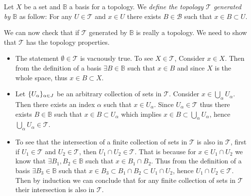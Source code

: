 \begin{definition}
	Let $ X $ be a set and $ \mathbb{B} $ a basis for a topology. We \emph{define the topology $ \mathcal{T} $ generated by $ \mathbb{B} $} as follow: For any $ U \in \mathcal{T} $ and $ x \in U $ there exists $ B \in \mathcal{B} $ such that $ x \in B \subset U $.
\end{definition}
\begin{remark}
	\label{remark:TopologyGeneratedByABasis}
	We can now check that if $ \mathcal{T} $ generated by $ \mathbb{B} $ is really a topology. We need to show that $ \mathcal{T} $ has the topology properties.
	\begin{itemize}
		\item The statement $ \emptyset \in \mathcal{T} $ is vacuously true. To see $ X \in \mathcal{T} $, Consider $ x \in X $. Then from the definition of a basis $ \exists B \in \mathbb{B} $ such that $ x \in B $ and since $ X $ is the whole space, thus $ x \in B \subset X $.
		\item Let $ \{U_\alpha\}_{\alpha \in J} $ be an arbitrary collection of sets in $ \mathcal{T} $. Consider $ x \in \bigcup_\alpha U_\alpha $. Then there exists an index $ \alpha $ such that $ x \in U_\alpha $. Since $ U_\alpha \in \mathcal{T} $ thus there exists $ B \in \mathbb{B} $ such that $ x \in B \subset U_\alpha $ which implies $ x \in B \subset \bigcup_\alpha U_\alpha $, hence $ \bigcup_\alpha U_\alpha \in \mathcal{T} $.
		\item To see that the intersection of a finite collection of sets in $ \mathcal{T} $ is also in $ \mathcal{T} $, first if $ U_1 \in \mathcal{T} $ and $ U_2 \in \mathcal{T} $, then $ U_1 \cap U_2 \in \mathcal{T} $. That is because for $ x\in U_1 \cap U_2 $ we know that $ \exists B_1,B_2 \in \mathbb{B} $ such that $ x\in B_1\cap B_2 $. Thus from the definition of a basis $ \exists B_3 \in \mathbb{B} $ such that $ x \in B_3 \subset B_1\cap B_2 \subset U_1\cap U_2 $, hence $ U_1\cap U_2 \in \mathcal{T} $. Then by induction we can conclude that for any finite collection of sets in $ \mathcal{T} $ their intersection is also in $ \mathcal{T} $.
 	\end{itemize}
\end{remark}

